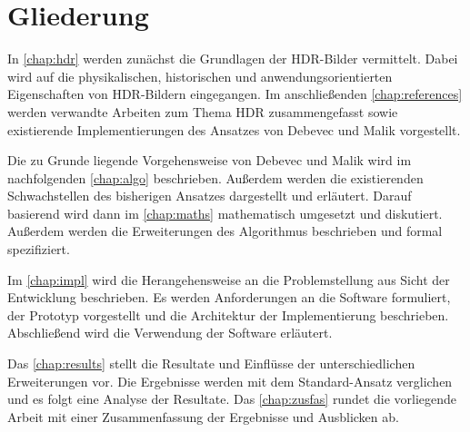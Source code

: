 \section{Gliederung}
In \autoref{chap:hdr} werden zunächst die Grundlagen der \gls{HDR}-Bilder vermittelt. Dabei wird auf die physikalischen, historischen und anwendungsorientierten Eigenschaften von \gls{HDR}-Bildern eingegangen. Im anschließenden \autoref{chap:references} werden verwandte Arbeiten zum Thema \gls{HDR} zusammengefasst sowie existierende Implementierungen des Ansatzes von Debevec und Malik vorgestellt.

Die zu Grunde liegende Vorgehensweise von Debevec und Malik wird im nachfolgenden \autoref{chap:algo} beschrieben. Außerdem werden die existierenden Schwachstellen des bisherigen Ansatzes dargestellt und erläutert. Darauf basierend wird dann im \autoref{chap:maths} mathematisch umgesetzt und diskutiert. Außerdem werden die Erweiterungen des Algorithmus beschrieben und formal spezifiziert.

Im \autoref{chap:impl} wird die Herangehensweise an die Problemstellung aus Sicht der Entwicklung beschrieben. Es werden Anforderungen an die Software formuliert, der Prototyp vorgestellt und die Architektur der Implementierung beschrieben. Abschließend wird die Verwendung der Software erläutert.

Das \autoref{chap:results} stellt die Resultate und Einflüsse der unterschiedlichen Erweiterungen vor. Die Ergebnisse werden mit dem Standard-Ansatz verglichen und es folgt eine Analyse der Resultate.
Das \autoref{chap:zusfas} rundet die vorliegende Arbeit mit einer Zusammenfassung der Ergebnisse und Ausblicken ab. 
